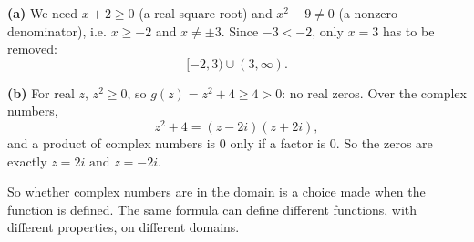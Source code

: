 \textbf{(a)} We need $x+2\ge0$ (a real square root) and $x^2-9\ne0$ (a nonzero denominator), i.e. $x\ge-2$ and $x\ne\pm3$. Since $-3<-2$, only $x=3$ has to be removed:
\[\boxed{[-2,3)\cup(3,\infty)}.\]

\textbf{(b)} For real $z$, $z^2\ge0$, so $g(z)=z^2+4\ge4>0$: no real zeros. Over the complex numbers,
\[z^2+4=(z-2i)(z+2i),\]
and a product of complex numbers is $0$ only if a factor is $0$. So the zeros are exactly $\boxed{z=2i\text{ and }z=-2i}$.

So whether complex numbers are in the domain is a choice made when the function is defined. The same formula can define different functions, with different properties, on different domains.
